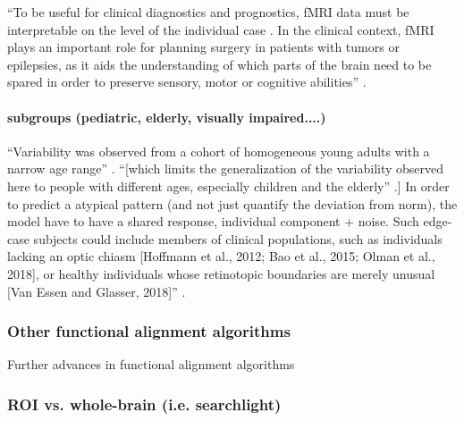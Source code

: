 %
``To be useful for clinical diagnostics and prognostics, fMRI data must be
interpretable on the level of the individual case \citep{dubois2016building}.
%
In the clinical context, fMRI plays an important role for planning surgery in
patients with tumors or epilepsies, as it aids the understanding of which parts
of the brain need to be spared in order to preserve sensory, motor or cognitive
abilities'' \citep{wegrzyn2018thought}.


\paragraph{subgroups (pediatric, elderly, visually impaired....)}


%
``Variability was observed from a cohort of homogeneous young adults with a
narrow age range'' \citep{zhen2017quantifying}.
%
``[which limits the generalization of the variability observed here to people
with different ages, especially children and the elderly''
\citet{zhen2017quantifying}.]
%
In order to predict a atypical pattern (and not just quantify the deviation from
norm), the model have to have a shared response, individual component + noise.
%
Such edge-case subjects could include members of clinical populations, such as
individuals lacking an optic chiasm [Hoffmann et al., 2012; Bao et al., 2015;
Olman et al., 2018], or healthy individuals whose retinotopic boundaries are
merely unusual [Van Essen and Glasser, 2018]'' \citep{benson2018bayesian}.


\subsubsection{Other functional alignment algorithms}

%
Further advances in functional alignment algorithms
\citep{feilong2022individualized, jiahui2022cross, turek2018capturing}


\subsubsection{ROI vs. whole-brain (i.e. searchlight)}



